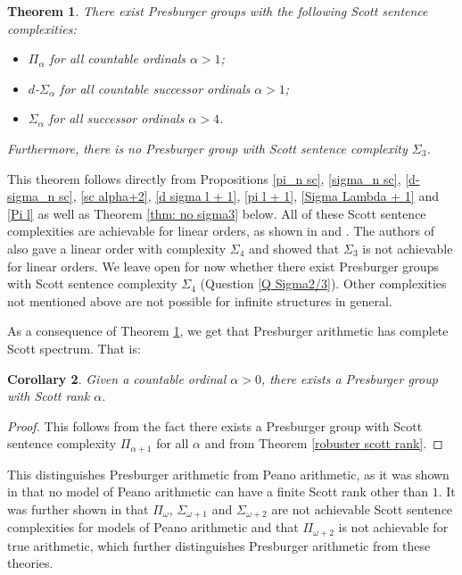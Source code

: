 \documentclass{amsart}%
\newtheorem{theorem}{Theorem}
\numberwithin{theorem}{section}
\newtheorem{corollary}[theorem]{Corollary}
\newcommand{\0}{\emptyset}
\begin{document}
\begin{theorem}
\label{main theorem}
    There exist Presburger groups with the following Scott sentence complexities:

    \begin{itemize}
    \item $\Pi_\alpha$ for all countable ordinals $\alpha>1$;
    \item $d$-$\Sigma_\alpha$ for all countable successor ordinals $\alpha>1$;
    \item $\Sigma_\alpha$ for all successor ordinals $\alpha>4$. 
    
\end{itemize}
Furthermore, there is no Presburger group with Scott sentence complexity $\Sigma_3$.
\end{theorem}
This theorem follows directly from Propositions  \ref{pi_n sc}, \ref{sigma_n sc},  \ref{d-sigma_n sc}, \ref{sc alpha+2}, \ref{d sigma l + 1}, \ref{pi l + 1}, \ref{Sigma Lambda + 1} and \ref{Pi l} as well as Theorem \ref{thm: no sigma3} below. All of these Scott sentence complexities are achievable for linear orders, as shown in \cite{tubo-david-mathew} and  \cite{david-dino}. The authors of \cite{david-dino} also gave a linear order with complexity $\Sigma_4$ and showed that $\Sigma_3$ is not achievable for linear orders. We leave open for now whether there exist Presburger groups with Scott sentence complexity $\Sigma_4$ (Question \ref{Q Sigma2/3}). Other complexities not mentioned above are not possible for infinite structures in general.

As a consequence of Theorem \ref{main theorem}, we get that Presburger arithmetic has complete Scott spectrum. That is:

\begin{corollary}
\label{complete scott spectrum}
Given a countable ordinal $\alpha>0$, there exists a Presburger group with Scott rank $\alpha$. 
\end{corollary}

\begin{proof}
    This follows from the fact there exists a Presburger group with Scott sentence complexity $\Pi_{\alpha+1}$ for all $\alpha$ and from Theorem \ref{robuster scott rank}. 
\end{proof}
This distinguishes Presburger arithmetic from Peano arithmetic, as it was shown in \cite{scott-spec-pa} that no model of Peano arithmetic can have a finite Scott rank other than $1$. It was further shown in \cite{scott-analysis-PA} that $\Pi_\omega$, $\Sigma_{\omega+1}$ and $\Sigma_{\omega+2}$ are not achievable Scott sentence complexities for models of Peano arithmetic and that $\Pi_{\omega+2}$ is not achievable for true arithmetic, which further distinguishes Presburger arithmetic from these theories. 
\end{document}
